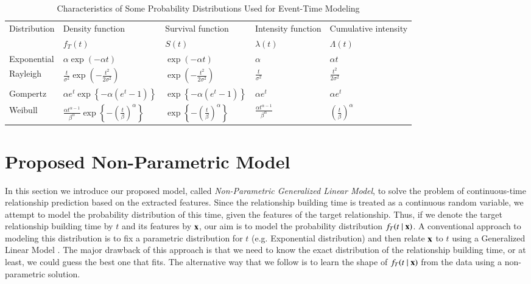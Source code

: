 \begin{table*}
	\centering
	\caption{Characteristics of Some Probability Distributions Used for Event-Time Modeling}
	\label{table:dists}
	\begin{tabu} to \textwidth {X X[c] X[c] X[c] X[c]}
		\toprule
		Distribution & Density function & Survival function & Intensity function & Cumulative intensity\\
		& $f_T(t)$ & $S(t)$ & $\lambda(t)$ & $\Lambda(t)$\\[1pt]
		\midrule %
		Exponential & $\alpha\exp(-\alpha t)$ & $\exp(-\alpha t)$ & $\alpha$ & $\alpha t$\\[4pt]
		Rayleigh & $\frac{t}{\sigma^2}\exp(-\frac{t^2}{2\sigma^2})$ & $\exp(-\frac{t^2}{2\sigma^2})$ & $\frac{t}{\sigma^2}$ & $\frac{t^2}{2\sigma^2}$\\[4pt]
		Gompertz & $\alpha e^t\exp\left\lbrace -\alpha(e^t-1) \right\rbrace$ & $\exp\left\lbrace -\alpha(e^t-1) \right\rbrace$ & $\alpha e^t$ & $\alpha e^t$\\[4pt]
		Weibull & $\frac{\alpha t^{\alpha-1}}{\beta^\alpha}\exp\left\lbrace-(\frac{t}{\beta})^\alpha\right\rbrace$ & $\exp\left\lbrace-(\frac{t}{\beta})^\alpha\right\rbrace$ & $\frac{\alpha t^{\alpha-1}}{\beta^\alpha}$ & $(\frac{t}{\beta})^\alpha$\\[2pt]
		\bottomrule %
	\end{tabu}
\end{table*}

\section{Proposed Non-Parametric Model}\label{sec:method}
In this section we introduce our proposed model, called \emph{Non-Parametric Generalized Linear Model}, to solve the problem of continuous-time relationship prediction based on the extracted features. 
Since the relationship building time is treated as a continuous random variable, we attempt to model the probability distribution of this time, given the features of the target relationship. Thus, if we denote the target relationship building time by $t$ and its features by $\mathbf{x}$, our aim is to model the probability distribution $f_T(t\mid \mathbf{x})$. A conventional approach to modeling this distribution is to fix a parametric distribution for $t$ (e.g. Exponential distribution) and then relate $\mathbf{x}$ to $t$ using a Generalized Linear Model \cite{sun2012will}. The major drawback of this approach is that we need to know the exact distribution of the relationship building time, or at least, we could guess the best one that fits. The alternative way that we follow is to learn the shape of $f_T(t\mid \mathbf{x})$ from the data using a non-parametric solution.

